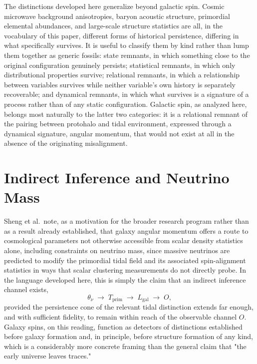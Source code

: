 \documentclass[11pt]{article}
\begin{document}
The distinctions developed here generalize beyond galactic spin. Cosmic microwave background anisotropies, baryon acoustic structure, primordial elemental abundances, and large-scale structure statistics are all, in the vocabulary of this paper, different forms of historical persistence, differing in what specifically survives. It is useful to classify them by kind rather than lump them together as generic fossils: state remnants, in which something close to the original configuration genuinely persists; statistical remnants, in which only distributional properties survive; relational remnants, in which a relationship between variables survives while neither variable's own history is separately recoverable; and dynamical remnants, in which what survives is a signature of a process rather than of any static configuration. Galactic spin, as analyzed here, belongs most naturally to the latter two categories: it is a relational remnant of the pairing between protohalo and tidal environment, expressed through a dynamical signature, angular momentum, that would not exist at all in the absence of the originating misalignment.

\section{Indirect Inference and Neutrino Mass}

Sheng et al.\ note, as a motivation for the broader research program rather than as a result already established, that galaxy angular momentum offers a route to cosmological parameters not otherwise accessible from scalar density statistics alone, including constraints on neutrino mass, since massive neutrinos are predicted to modify the primordial tidal field and its associated spin-alignment statistics in ways that scalar clustering measurements do not directly probe. In the language developed here, this is simply the claim that an indirect inference channel exists,
\begin{equation}
\theta_\nu \;\to\; T_{\mathrm{prim}} \;\to\; L_{\mathrm{gal}} \;\to\; O,
\end{equation}
provided the persistence cone of the relevant tidal distinction extends far enough, and with sufficient fidelity, to remain within reach of the observable channel $O$. Galaxy spins, on this reading, function as detectors of distinctions established before galaxy formation and, in principle, before structure formation of any kind, which is a considerably more concrete framing than the general claim that "the early universe leaves traces."
\end{document}
